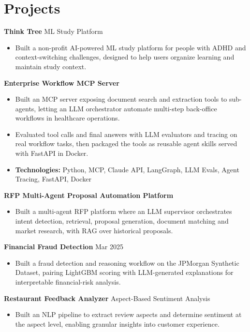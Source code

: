 \documentclass[10pt,a4paper]{article}
\begin{document}
\section{Projects}
\textbf{Think Tree} \textbar{} ML Study Platform\par
\begin{itemize}
  \item Built a non-profit AI-powered ML study platform for people with ADHD and context-switching challenges, designed to help users organize learning and maintain study context.
\end{itemize}
\textbf{Enterprise Workflow MCP Server}\par
\begin{itemize}
  \item Built an MCP server exposing document search and extraction tools to sub-agents, letting an LLM orchestrator automate multi-step back-office workflows in healthcare operations.
  \item Evaluated tool calls and final answers with LLM evaluators and tracing on real workflow tasks, then packaged the tools as reusable agent skills served with FastAPI in Docker.
  \item \textbf{Technologies:} Python, MCP, Claude API, LangGraph, LLM Evals, Agent Tracing, FastAPI, Docker
\end{itemize}
\textbf{RFP Multi-Agent Proposal Automation Platform}\par
\begin{itemize}
  \item Built a multi-agent RFP platform where an LLM supervisor orchestrates intent detection, retrieval, proposal generation, document matching and market research, with RAG over historical proposals.
\end{itemize}
\textbf{Financial Fraud Detection} \textbar{} Mar 2025\par
\begin{itemize}
  \item Built a fraud detection and reasoning workflow on the JPMorgan Synthetic Dataset, pairing LightGBM scoring with LLM-generated explanations for interpretable financial-risk analysis.
\end{itemize}
\textbf{Restaurant Feedback Analyzer} \textbar{} Aspect-Based Sentiment Analysis\par
\begin{itemize}
  \item Built an NLP pipeline to extract review aspects and determine sentiment at the aspect level, enabling granular insights into customer experience.
\end{itemize}
\end{document}
